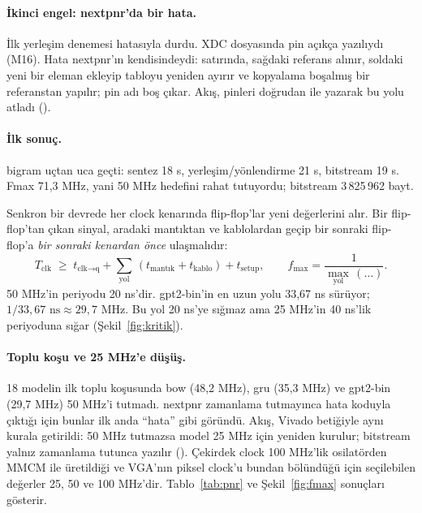 \paragraph{İkinci engel: nextpnr'da bir hata.} İlk yerleşim denemesi  hatasıyla durdu. XDC dosyasında pin açıkça yazılıydı (M16). Hata nextpnr'ın kendisindeydi:  satırında, sağdaki referans alınır, soldaki  yeni bir eleman ekleyip tabloyu yeniden ayırır ve kopyalama boşalmış bir referanstan yapılır; pin adı boş çıkar. Akış, pinleri doğrudan  ile yazarak bu yolu atladı ().

\paragraph{İlk sonuç.} bigram uçtan uca geçti: sentez 18 s, yerleşim/yönlendirme 21 s, bitstream 19 s. Fmax 71,3 MHz, yani 50 MHz hedefini rahat tutuyordu; bitstream 3\,825\,962 bayt.

\begin{ozet}
Senkron bir devrede her clock kenarında flip-flop'lar yeni değerlerini alır. Bir flip-flop'tan çıkan sinyal, aradaki mantıktan ve kablolardan geçip bir sonraki flip-flop'a \emph{bir sonraki kenardan önce} ulaşmalıdır:
\[ T_\text{clk} \;\ge\; t_\text{clk→q} + \sum_\text{yol}\,(t_\text{mantık} + t_\text{kablo}) + t_\text{setup}, \qquad f_\text{max} = \frac{1}{\max_\text{yol}\,(\dots)}. \]
50 MHz'in periyodu 20 ns'dir. gpt2-bin'in en uzun yolu 33,67 ns sürüyor; $1/33{,}67\text{ ns} \approx 29{,}7$ MHz. Bu yol 20 ns'ye sığmaz ama 25 MHz'in 40 ns'lik periyoduna sığar (Şekil~\ref{fig:kritik}).
\end{ozet}

\paragraph{Toplu koşu ve 25 MHz'e düşüş.} 18 modelin ilk toplu koşusunda bow (48,2 MHz), gru (35,3 MHz) ve gpt2-bin (29,7 MHz) 50 MHz'i tutmadı. nextpnr zamanlama tutmayınca hata koduyla çıktığı için bunlar ilk anda “hata” gibi göründü. Akış, Vivado betiğiyle aynı kurala getirildi: 50 MHz tutmazsa model 25 MHz için yeniden kurulur; bitstream yalnız zamanlama tutunca yazılır (). Çekirdek clock 100 MHz'lik osilatörden MMCM ile üretildiği ve VGA'nın piksel clock'u bundan bölündüğü için seçilebilen değerler 25, 50 ve 100 MHz'dir. Tablo~\ref{tab:pnr} ve Şekil~\ref{fig:fmax} sonuçları gösterir.

